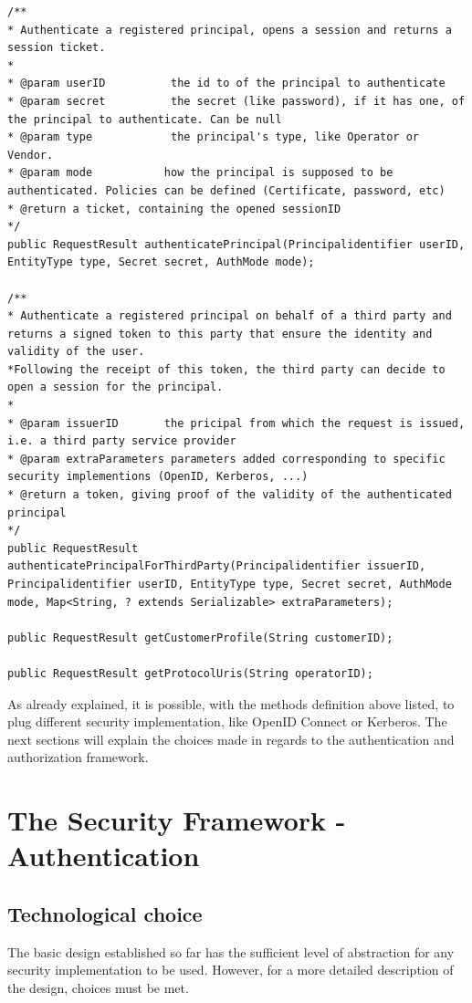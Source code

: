 \lstset{language=Java}
\begin{lstlisting}
/**
* Authenticate a registered principal, opens a session and returns a session ticket.
*
* @param userID          the id to of the principal to authenticate
* @param secret          the secret (like password), if it has one, of the principal to authenticate. Can be null
* @param type            the principal's type, like Operator or Vendor.
* @param mode          	how the principal is supposed to be authenticated. Policies can be defined (Certificate, password, etc)
* @return a ticket, containing the opened sessionID
*/
public RequestResult authenticatePrincipal(Principalidentifier userID, EntityType type, Secret secret, AuthMode mode);

/**
* Authenticate a registered principal on behalf of a third party and returns a signed token to this party that ensure the identity and validity of the user.
*Following the receipt of this token, the third party can decide to open a session for the principal.
*
* @param issuerID       the pricipal from which the request is issued, i.e. a third party service provider
* @param extraParameters parameters added corresponding to specific security implementions (OpenID, Kerberos, ...)
* @return a token, giving proof of the validity of the authenticated principal
*/
public RequestResult authenticatePrincipalForThirdParty(Principalidentifier issuerID, Principalidentifier userID, EntityType type, Secret secret, AuthMode mode, Map<String, ? extends Serializable> extraParameters);

public RequestResult getCustomerProfile(String customerID);

public RequestResult getProtocolUris(String operatorID);
\end{lstlisting}

As already explained, it is possible, with the methods definition above listed, to plug different security implementation, like OpenID Connect or Kerberos. The next sections will explain the choices made in regards to the authentication and authorization framework.

\section{The Security Framework - Authentication}

\subsection{Technological choice}
The basic design established so far has the sufficient level of abstraction for any security implementation to be used. However, for a more detailed description of the design, choices must be met.

